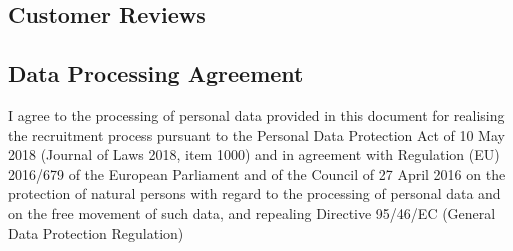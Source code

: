 \documentclass{yb}
\begin{document}
\subsection*{Customer Reviews}





\subsection*{Data Processing Agreement}

I agree to the processing of personal data provided in this document for realising the recruitment process pursuant to the Personal Data Protection Act of 10 May 2018 (Journal of Laws 2018, item 1000) and in agreement with Regulation (EU) 2016/679 of the European Parliament and of the Council of 27 April 2016 on the protection of natural persons with regard to the processing of personal data and on the free movement of such data, and repealing Directive 95/46/EC (General Data Protection Regulation)
\end{document}
